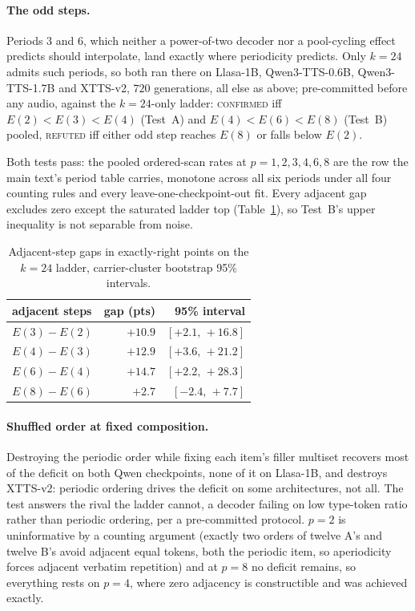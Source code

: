 \paragraph{The odd steps.} Periods $3$ and $6$, which neither a
power-of-two decoder nor a pool-cycling effect predicts should
interpolate, land exactly where periodicity predicts. Only $k{=}24$
admits such periods, so both ran there on Llasa-1B, Qwen3-TTS-0.6B,
Qwen3-TTS-1.7B and XTTS-v2, $720$ generations, all else as above;
pre-committed before any audio, against the $k{=}24$-only ladder:
\textsc{confirmed} iff $E(2)<E(3)<E(4)$ (Test~A) and $E(4)<E(6)<E(8)$
(Test~B) pooled, \textsc{refuted} iff either odd step reaches $E(8)$
or falls below $E(2)$.

Both tests pass: the pooled ordered-scan rates at $p=1,2,3,4,6,8$ are
the row the main text's period table carries, monotone across all six
periods under all four counting rules and every
leave-one-checkpoint-out fit. Every adjacent gap excludes zero except
the saturated ladder top (Table~\ref{tab:oddgaps}), so Test~B's upper
inequality is not separable from noise.

\begin{table}[htbp]
\centering
\caption{Adjacent-step gaps in exactly-right points on the $k{=}24$
ladder, carrier-cluster bootstrap 95\% intervals.}
\label{tab:oddgaps}
\small
\begin{tabular}{@{}lrr@{}}
\toprule
adjacent steps & gap (pts) & 95\% interval \\
\midrule
$E(3)-E(2)$ & $+10.9$ & $[+2.1,\,+16.8]$ \\
$E(4)-E(3)$ & $+12.9$ & $[+3.6,\,+21.2]$ \\
$E(6)-E(4)$ & $+14.7$ & $[+2.2,\,+28.3]$ \\
$E(8)-E(6)$ & $+2.7$  & $[-2.4,\,+7.7]$ \\
\bottomrule
\end{tabular}
\end{table}

\paragraph{Shuffled order at fixed composition.} Destroying the
periodic order while fixing each item's filler multiset recovers most
of the deficit on both Qwen checkpoints, none of it on Llasa-1B, and
destroys XTTS-v2: periodic ordering drives the deficit on some
architectures, not all. The test answers the rival the ladder cannot,
a decoder failing on low type-token ratio rather than periodic
ordering, per a pre-committed protocol. $p{=}2$ is uninformative by a
counting argument (exactly two orders of twelve A's and twelve B's avoid
adjacent equal tokens, both the periodic item, so aperiodicity forces
adjacent verbatim repetition) and at $p{=}8$ no deficit remains, so
everything rests on $p{=}4$, where zero adjacency is constructible and
was achieved exactly.

